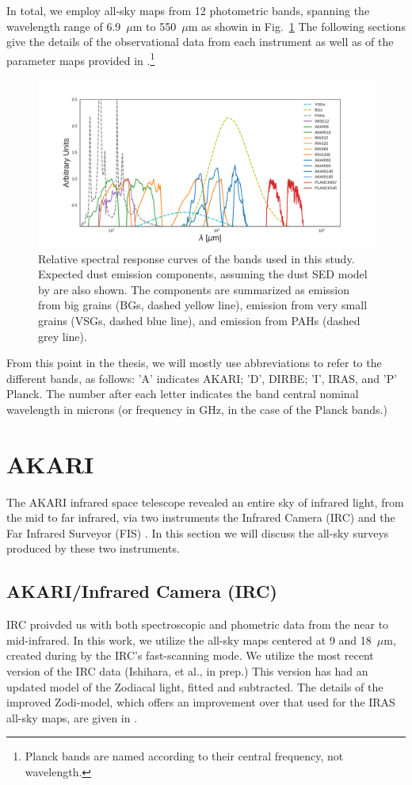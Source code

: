     In total, we employ all-sky maps from 12 photometric bands, spanning the wavelength range of 6.9~$\mu$m to 550~$\mu$m as showin in Fig.~\ref{fig:Filter_coverage_example_full} The following sections give the details of the observational data from each instrument as well as of the parameter maps provided in \cite{planck15X}.\footnote{Planck bands are named according to their central frequency, not wavelength.}
      \begin{figure}
        \centering
        \includegraphics[width=\textwidth]{../Plots/ch_datasources/Filter_coverage_example_full.pdf}
        \caption{Relative spectral response curves of the bands used in this study. Expected dust emission components, assuming the dust SED model by \citep{dustem11} are also shown. The components are summarized as emission from big grains (BGs, dashed yellow line), emission from very small grains (VSGs, dashed blue line), and emission from PAHs (dashed grey line).}
        \label{fig:Filter_coverage_example_full}
      \end{figure}
    From this point in the thesis, we will mostly use abbreviations to refer to the different bands, as follows: 'A' indicates AKARI; 'D', DIRBE; 'I', IRAS, and 'P' Planck. The number after each letter indicates the band central nominal wavelength in microns (or frequency in GHz, in the case of the Planck bands.)

  \section{AKARI}
       The AKARI infrared space telescope revealed an entire sky of infrared light, from the mid to far infrared, via two instruments \citep{akari07} the Infrared Camera (IRC)\citep{irc07} and the Far Infrared Surveyor (FIS) \citep{fis07}. In this section we will discuss the all-sky surveys produced by these two instruments.
       \subsection{AKARI/Infrared Camera (IRC) }
           IRC proivded us with both spectroscopic and phometric data from the near to mid-infrared. In this work, we utilize the all-sky maps centered at 9 and 18~$\mu$m, created during by the IRC's fast-scanning mode. We utilize the most recent version of the IRC data (Ishihara, et al., in prep.) This version has had an updated model of the Zodiacal light, fitted and subtracted. The details of the improved Zodi-model, which offers an improvement over that used for the IRAS all-sky maps, are given in \cite{kondo16}.
